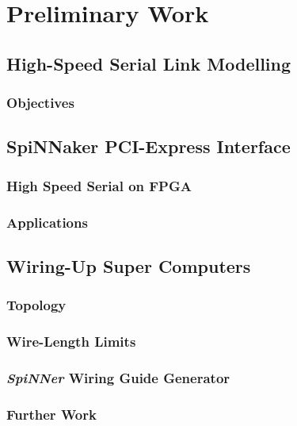 \chapter{Preliminary Work}
	
	\section{High-Speed Serial Link Modelling}
		
		\subsection{Objectives}
	
	\section{SpiNNaker PCI-Express Interface}
		
		\subsection{High Speed Serial on FPGA}
		
		\subsection{Applications}
	
	\section{Wiring-Up Super Computers}
		
		\subsection{Topology}
		
		\subsection{Wire-Length Limits}
		
		\subsection{\emph{SpiNNer} Wiring Guide Generator}
		
		\subsection{Further Work}
	
